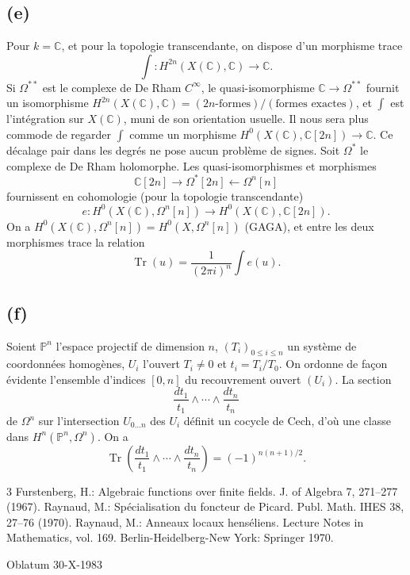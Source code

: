 \documentclass[11pt]{article}
\DeclareMathOperator{\Tr}{Tr}
\newcommand{\CC}{\mathbb C}
\newcommand{\PP}{\mathbb P}
\begin{document}
\subsection*{(e)}
Pour $k=\CC$, et pour la topologie transcendante, on dispose d'un morphisme trace
\[
        \int:H^{2n}(X(\CC),\CC)\longrightarrow\CC.
\]
Si $\Omega^{**}$ est le complexe de De Rham $C^\infty$, le quasi-isomorphisme $\CC\to\Omega^{**}$ fournit un isomorphisme $H^{2n}(X(\CC),\CC)=(2n\text{-formes})/(\text{formes exactes})$, et $\int$ est l'intégration sur $X(\CC)$, muni de son orientation usuelle. Il nous sera plus commode de regarder $\int$ comme un morphisme $H^0(X(\CC),\CC[2n])\to\CC$. Ce décalage pair dans les degrés ne pose aucun problème de signes. Soit $\Omega^*$ le complexe de De Rham holomorphe. Les quasi-isomorphismes et morphismes
\[
        \CC[2n]\longrightarrow\Omega^*[2n]\longleftarrow\Omega^n[n]
\]
fournissent en cohomologie (pour la topologie transcendante)
\[
        e:H^0(X(\CC),\Omega^n[n])\longrightarrow H^0(X(\CC),\CC[2n]).
\]
On a $H^0(X(\CC),\Omega^n[n])=H^0(X,\Omega^n[n])$ (GAGA), et entre les deux morphismes trace la relation
\[
        \Tr(u)=\frac{1}{(2\pi i)^n}\int e(u).
\]

\subsection*{(f)}
Soient $\PP^n$ l'espace projectif de dimension $n$, $(T_i)_{0\le i\le n}$ un système de coordonnées homogènes, $U_i$ l'ouvert $T_i\ne0$ et $t_i=T_i/T_0$. On ordonne de façon évidente l'ensemble d'indices $[0,n]$ du recouvrement ouvert $(U_i)$. La section
\[
        \frac{dt_1}{t_1}\wedge\cdots\wedge\frac{dt_n}{t_n}
\]
de $\Omega^n$ sur l'intersection $U_{0\ldots n}$ des $U_i$ définit un cocycle de Cech, d'où une classe dans $H^n(\PP^n,\Omega^n)$. On a
\[
        \Tr\left(\frac{dt_1}{t_1}\wedge\cdots\wedge\frac{dt_n}{t_n}\right)
        =(-1)^{n(n+1)/2}.
\]

\begin{thebibliography}{3}
 Furstenberg, H.: Algebraic functions over finite fields. J. of Algebra 7, 271--277 (1967).
 Raynaud, M.: Spécialisation du foncteur de Picard. Publ. Math. IHES 38, 27--76 (1970).
 Raynaud, M.: Anneaux locaux henséliens. Lecture Notes in Mathematics, vol. 169. Berlin-Heidelberg-New York: Springer 1970.
\end{thebibliography}

\bigskip
\begin{center}
Oblatum 30-X-1983
\end{center}
\end{document}

